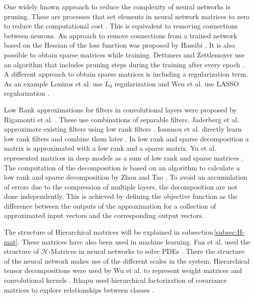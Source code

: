 \documentclass[doctype=mastersthesis,BCOR=15mm,biblatex]{ldvbook}%
\begin{document}
One widely known approach to reduce the complexity of neural networks is pruning. 
These are processes that set elements in neural network matrices to zero to reduce the computational cost \cite{blalock_what_2020}.
This is equivalent to removing connections between neurons.
An approach to remove connections from a trained network based on the Hessian of the loss function was proposed by Hassibi \cite{hassibi_optimal_1993}.
It is also possible to obtain sparse matrices while training.
Dettmers and Zettlemoyer use an algorithm that includes pruning steps during the training after every epoch \cite{dettmers_sparse_2019}.
A different approach to obtain sparse matrices is including a regularization term.
As an example Louizos et al. use $L_0$ regularization  \cite{louizos_learning_2018} and Wen et al. use LASSO regularization \cite{wen_learning_2016}.

Low Rank approximations for filters in convolutional layers were proposed by Rigamonti et al. \cite{rigamonti_learning_2013}. These use combinations of separable filters. Jaderberg et al. approximate existing filters using low rank filters \cite{jaderberg_speeding_2014}. 
Ioannou et al. directly learn low rank filters and combine them later \cite{ioannou_training_2016}.
In low rank and sparse decomposition a matrix is approximated with a low rank and a sparse matrix. 
Yu et al. represented matrices in deep models as a sum of low rank and sparse matrices \cite{yu_compressing_2017}.
The computation of the decomposition is based on an algorithm to calculate a low rank and sparse decomposition by Zhou and Tao \cite{zhou_greedy_2013}.
To avoid an accumulation of errors due to the compression of multiple layers, the decomposition are not done independently.
This is achieved by defining the objective function as the difference between the outputs of the approximation for a collection of approximated input vectors and the corresponding output vectors.

The structure of Hierarchical matrices will be explained in subsection\,\ref{subsec:H-mat}. These matrices have also been used in machine learning. 
Fan et al. used the structure of $\mathcal{H}$-Matrices in neural networks to solve PDEs \cite{fan_multiscale_2019}. There the structure of the neural network makes use of the different scales in the system.
Hierarchical tensor decompositions were used by Wu et al. to represent weight matrices and convolutional kernels \cite{wu_hybrid_2020}.
Ithapu used hierarchical factorization of covariance matrices to explore relationships between classes \cite{ithapu_decoding_2017}.
\end{document}
